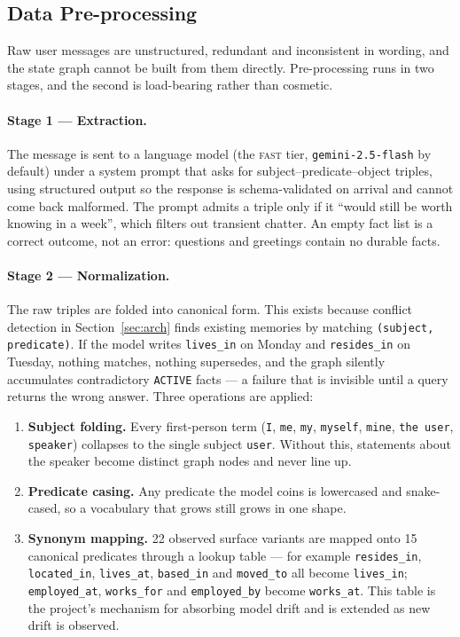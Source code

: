 \documentclass[11pt,a4paper]{article}
\begin{document}
\subsection{Data Pre-processing}
\label{sec:preproc}

Raw user messages are unstructured, redundant and inconsistent in wording, and
the state graph cannot be built from them directly. Pre-processing runs in two
stages, and the second is load-bearing rather than cosmetic.

\paragraph{Stage 1 --- Extraction.} The message is sent to a language model
(the \textsc{fast} tier, \texttt{gemini-2.5-flash} by default) under a system
prompt that asks for subject--predicate--object triples, using structured output
so the response is schema-validated on arrival and cannot come back malformed.
The prompt admits a triple only if it ``would still be worth knowing in a
week'', which filters out transient chatter. An empty fact list is a correct
outcome, not an error: questions and greetings contain no durable facts.

\paragraph{Stage 2 --- Normalization.} The raw triples are folded into canonical
form. This exists because conflict detection in Section~\ref{sec:arch} finds
existing memories by matching \texttt{(subject, predicate)}. If the model
writes \texttt{lives\_in} on Monday and \texttt{resides\_in} on Tuesday,
nothing matches, nothing supersedes, and the graph silently accumulates
contradictory \texttt{ACTIVE} facts --- a failure that is invisible until a
query returns the wrong answer. Three operations are applied:

\begin{enumerate}
  \item \textbf{Subject folding.} Every first-person term
        (\texttt{I}, \texttt{me}, \texttt{my}, \texttt{myself}, \texttt{mine},
        \texttt{the user}, \texttt{speaker}) collapses to the single subject
        \texttt{user}. Without this, statements about the speaker become
        distinct graph nodes and never line up.
  \item \textbf{Predicate casing.} Any predicate the model coins is
        lowercased and snake-cased, so a vocabulary that grows still grows in
        one shape.
  \item \textbf{Synonym mapping.} 22 observed surface variants are mapped onto
        15 canonical predicates through a lookup table --- for example
        \texttt{resides\_in}, \texttt{located\_in}, \texttt{lives\_at},
        \texttt{based\_in} and \texttt{moved\_to} all become \texttt{lives\_in};
        \texttt{employed\_at}, \texttt{works\_for} and \texttt{employed\_by}
        become \texttt{works\_at}. This table is the project's mechanism for
        absorbing model drift and is extended as new drift is observed.
\end{enumerate}
\end{document}
